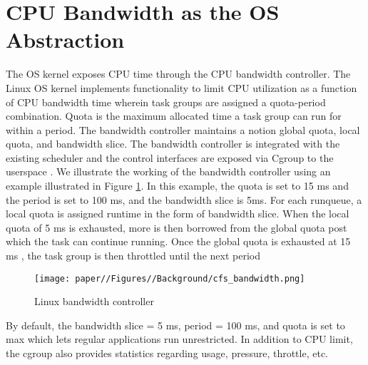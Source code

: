 
\section{CPU Bandwidth as the OS Abstraction}
\label{sec:os_interface}

The OS kernel exposes CPU time  through the CPU bandwidth controller.
The Linux OS kernel implements functionality to limit CPU utilization as a function of CPU bandwidth time \cite{turner_cpu_2010} wherein task groups are assigned a quota-period combination. Quota is the maximum allocated time a task group can run for within a period. 
The bandwidth controller maintains a notion global quota, local quota, and bandwidth slice. 
The bandwidth controller is integrated with the existing scheduler and the control interfaces are exposed via Cgroup to the userspace \cite{noauthor_control_nodate}. We illustrate the working of the bandwidth controller using an example illustrated in Figure \ref{fig:cfs_bandwidth}. In this example, the quota is set to 15 ms and the period is set to 100 ms, and the bandwidth slice is 5ms. For each runqueue, a local quota is assigned runtime in the form of bandwidth slice. When the local quota of 5 ms is exhausted, more is then borrowed from the global quota post which the task can continue running.  Once the global quota is exhausted at 15 ms , the task group is then throttled until the next period

\begin{figure}
    \centering
    \texttt{[image: paper//Figures//Background/cfs\_bandwidth.png]}
    \caption{Linux bandwidth controller }
    \label{fig:cfs_bandwidth}
\end{figure}
\begin{figure}
    
    
\end{figure}
By default, the bandwidth slice = 5 ms, period = 100 ms, and quota is set to max which lets regular applications run unrestricted. In addition to CPU limit, the cgroup also provides statistics regarding usage, pressure, throttle, etc.

